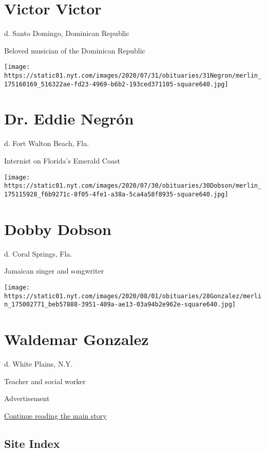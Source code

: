 \hypertarget{victor-victor}{%
\section{Victor Victor}\label{victor-victor}}

d. Santo Domingo, Dominican Republic

Beloved musician of the Dominican Republic

\texttt{[image: https://static01.nyt.com/images/2020/07/31/obituaries/31Negron/merlin\_175160169\_516322ae-fd23-4969-b6b2-193ced371105-square640.jpg]}

\hypertarget{dr-eddie-negruxf3n}{%
\section{Dr. Eddie Negrón}\label{dr-eddie-negruxf3n}}

d. Fort Walton Beach, Fla.

Internist on Florida's Emerald Coast

\texttt{[image: https://static01.nyt.com/images/2020/07/30/obituaries/30Dobson/merlin\_175115928\_f6b9271c-8f05-4fe1-a38a-5ca4a58f8935-square640.jpg]}

\hypertarget{dobby-dobson}{%
\section{Dobby Dobson}\label{dobby-dobson}}

d. Coral Springs, Fla.

Jamaican singer and songwriter

\texttt{[image: https://static01.nyt.com/images/2020/08/01/obituaries/28Gonzalez/merlin\_175002771\_beb57888-3951-409a-ae13-03a94b2e962e-square640.jpg]}

\hypertarget{waldemar-gonzalez}{%
\section{Waldemar Gonzalez}\label{waldemar-gonzalez}}

d. White Plains, N.Y.

Teacher and social worker

Advertisement

\protect\hyperlink{after-bottom}{Continue reading the main story}

\hypertarget{site-index}{%
\subsection{Site Index}\label{site-index}}

